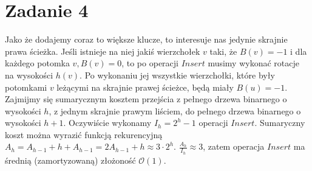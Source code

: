 \documentclass[12pt, a4paper]{article}
\newcommand{\MCALO}{\mathcal{O}}
\begin{document}
\section*{Zadanie 4}
Jako że dodajemy coraz to większe klucze, to interesuje nas jedynie skrajnie
prawa ścieżka. Jeśli istnieje na niej jakiś wierzchołek $v$ taki, że $B(v)=-1$
i dla każdego potomka $v, B(v) = 0$, to po operacji $\mathit{Insert}$ musimy
wykonać rotacje na wysokości $h(v)$. Po wykonaniu jej wszystkie wierzchołki,
które były potomkami $v$ leżącymi na skrajnie prawej ścieżce, będą miały
$B(u)=-1$. Zajmijmy się sumarycznym kosztem przejścia z pełnego drzewa
binarnego o wysokości $h$, z jednym skrajnie prawym liściem, do pełnego drzewa
binarnego o wysokości $h+1$. Oczywiście wykonamy $I_h = 2^h - 1$ operacji
$\mathit{Insert}$. Sumaryczny koszt można wyrazić funkcją rekurencyjną $A_h
= A_{h-1} + h + A_{h-1} = 2A_{h-1} + h \approx 3\cdot 2^h$. $\frac{A_h}{I_h}
\approx 3$, zatem operacja $\mathit{Insert}$ ma średnią (zamortyzowaną)
złożoność $\MCALO(1)$.
\end{document}
